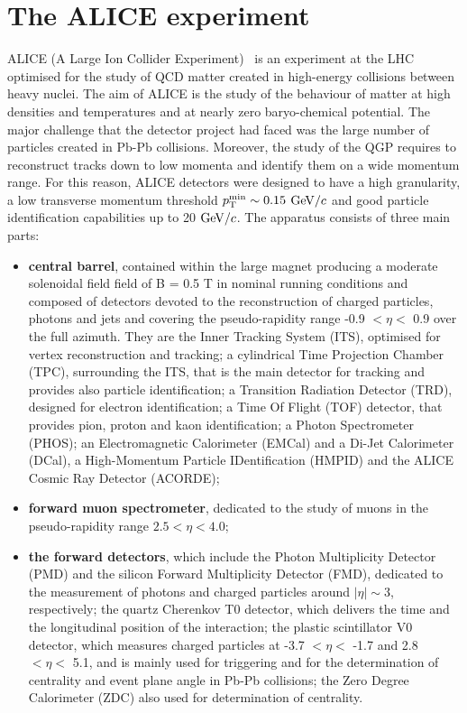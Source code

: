 \section{The ALICE experiment}
ALICE (A Large Ion Collider Experiment)~\cite{Abelev:2014ffa} is an experiment 
at the LHC optimised for the study of QCD matter
created in high-energy collisions between heavy nuclei.
The aim of ALICE is the study of the behaviour of matter at high densities and temperatures 
and at nearly zero baryo-chemical potential. 
The major challenge that the detector project had faced was the large number of 
particles created in Pb-Pb collisions. Moreover, the study of the QGP requires to reconstruct tracks down to
low momenta and identify them on a wide momentum range.
For this reason, ALICE detectors were designed to have a 
high granularity, a low transverse momentum threshold $p_{\rm T}^{\rm min} \sim 0.15 $ 
$\mathrm{GeV}/c$ and good particle identification capabilities up to 20 $\mathrm{GeV}/c$.
The apparatus consists of three main parts: 
\begin{itemize}
\item \textbf{central barrel}, contained within the large magnet producing a moderate solenoidal field
field of B = 0.5 T in nominal running conditions and composed of detectors devoted to the reconstruction of charged particles, photons
and jets and covering the pseudo-rapidity range -0.9 $< \eta <$ 0.9 over the 
full azimuth. They are the Inner Tracking System (ITS), optimised for vertex 
reconstruction and tracking; a cylindrical Time Projection Chamber (TPC),
 surrounding the ITS, that is the main detector for tracking and provides also particle identification; a 
 Transition Radiation Detector (TRD), designed for electron identification; 
 a Time Of Flight (TOF) detector, that provides pion, proton and kaon 
 identification; a Photon Spectrometer (PHOS); an Electromagnetic 
 Calorimeter (EMCal) and a Di-Jet Calorimeter (DCal), a High-Momentum Particle IDentification (HMPID) 
 and the ALICE Cosmic Ray Detector (ACORDE);
\item \textbf{forward muon spectrometer}, dedicated to the study of 
muons in the pseudo-rapidity range $2.5< \eta < 4.0$;
\item \textbf{the forward detectors}, which include the Photon Multiplicity Detector 
(PMD) and the silicon Forward Multiplicity Detector (FMD), dedicated to the 
measurement of photons and charged particles around $|\eta| \sim 3$, respectively; 
the quartz Cherenkov T0 detector, which delivers the time and the longitudinal
 position of the interaction; the plastic scintillator V0 detector, which measures 
 charged particles at -3.7 $< \eta <$ -1.7 and 2.8 $< \eta <$ 5.1, and is mainly used
  for triggering and for the determination of centrality and event plane angle in 
  Pb-Pb collisions; the Zero Degree Calorimeter (ZDC) also used for determination of centrality.
\end{itemize}
